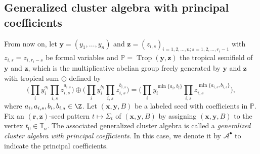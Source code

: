 \subsection{Generalized cluster algebra with principal coefficients}\label{ss:principal-gca}

From now on, let $\mathbf{y}=(y_1,\dots, y_n)$ and $\mathbf{z}=(z_{i,s})_{i=1,2,\dots,n;s=1,2,\dots,r_i-1}$ with $z_{i,s}=z_{i,r_{i}-s}$ be formal variables and $\mathbb{P}=\operatorname{Trop}(\mathbf{y},\mathbf{z})$ the tropical semifield of $\mathbf{y}$ and $\mathbf{z}$, which is the multiplicative abelian group freely
generated by $\mathbf{y}$ and $\mathbf{z}$ with tropical sum $\oplus$ defined by
\begin{equation*}
\biggl(\prod\limits_{i}y_i^{a_i}\prod\limits_{i,s}z_{i,s}^{a_{i,s}}\biggr)\oplus\biggl(\prod\limits_{i}y_i^{b_i}\prod\limits_{i,s}z_{i,s}^{b_{i,s}}\biggr)=\biggl(\prod\limits_{i}y_i^{\min\{a_i,b_i\}}\prod\limits_{i,s}z_{i,s}^{\min\{a_{i,s},b_{i,s}\}}\biggr),
\end{equation*}
where $a_i,a_{i,s},b_i,b_{i,s}\in \Z$. Let $(\mathbf{x},\mathbf{y}, B)$ be a labeled seed with coefficients in $\mathbb{P}$. Fix an $(\mathbf{r},\mathbf{z})$-seed pattern $t\mapsto \Sigma_t$ of $(\mathbf{x},\mathbf{y}, B)$ by assigning $(\mathbf{x},\mathbf{y}, B)$ to the vertex $t_0\in \mathbb{T}_n$. The associated generalized cluster algebra is called a {\it generalized cluster algebra with principal coefficients}. In this case, we denote it by $\mathcal{A}^\bullet$ to indicate the principal coefficients.


